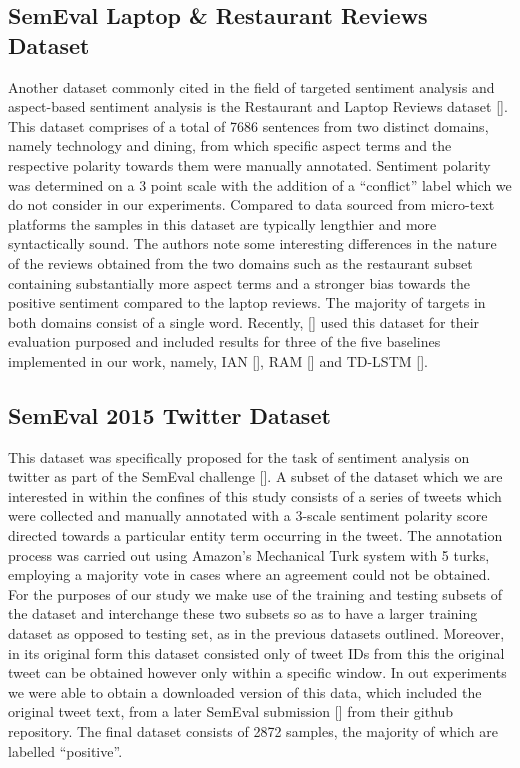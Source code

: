\documentclass[12pt, a4paper]{report}
\theoremstyle{definition}
\theoremstyle{definition}%
\theoremstyle{definition}%
\theoremstyle{definition}%
\theoremstyle{definition}%
\theoremstyle{definition}%
\renewcommand{\cite}[1]{[\citealp{#1}]}
\begin{document}
\subsection{SemEval Laptop \& Restaurant Reviews Dataset}
Another dataset commonly cited in the field of targeted sentiment analysis and aspect-based sentiment analysis is the Restaurant and Laptop Reviews dataset \cite{pontiki}. This dataset comprises of a total of 7686 sentences from two distinct domains, namely technology and dining, from which specific aspect terms and the respective polarity towards them were manually annotated. Sentiment polarity was determined on a 3 point scale with the addition of a \enquote{conflict} label which we do not consider in our experiments. Compared to data sourced from micro-text platforms the samples in this dataset are typically lengthier and more syntactically sound. The authors note some interesting differences in the nature of the reviews obtained from the two domains such as the restaurant subset containing substantially more aspect terms and a stronger bias towards the positive sentiment compared to the laptop reviews. The majority of targets in both domains consist of a single word. Recently, \cite{xue2018} used this dataset for their evaluation purposed and included results for three of the five baselines implemented in our work, namely, IAN \cite{dehongma2017}, RAM \cite{chen2017} and TD-LSTM \cite{tang2016b}.

\subsection{SemEval 2015 Twitter Dataset}
This dataset was specifically proposed for the task of sentiment analysis on twitter as part of the SemEval challenge \cite{rosenthal2015}. A subset of the dataset which we are interested in within the confines of this study consists of a series of tweets which were collected and manually annotated with a 3-scale sentiment polarity score directed towards a particular entity term occurring in the tweet. The annotation process was carried out using Amazon's Mechanical Turk system with 5 turks, employing a majority vote in cases where an agreement could not be obtained. For the purposes of our study we make use of the training and testing subsets of the dataset and interchange these two subsets so as to have a larger training dataset as opposed to testing set, as in the previous datasets outlined. Moreover, in its original form this dataset consisted only of tweet IDs  from this the original tweet can be obtained however only within a specific window. In out experiments we were able to obtain a  downloaded version of this data, which included the original tweet text, from a later SemEval submission \cite{baziotis2017} from their github repository. The final dataset consists of 2872 samples, the majority of which are labelled \enquote{positive}.
\end{document}
